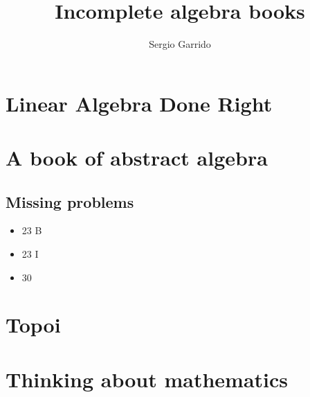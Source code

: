\documentclass{bookSolutions}
\title{Incomplete algebra books}
\author{Sergio Garrido}
\begin{document}
\tableofcontents
\newpage

\section{Linear Algebra Done Right}











\newpage
\section{A book of abstract algebra}
\subsection{Missing problems}
\begin{itemize}
    \item 23 B
    \item 23 I
    \item 30
\end{itemize}


















\newpage
\section{Topoi}


\newpage
\section{Thinking about mathematics}

\end{document}
